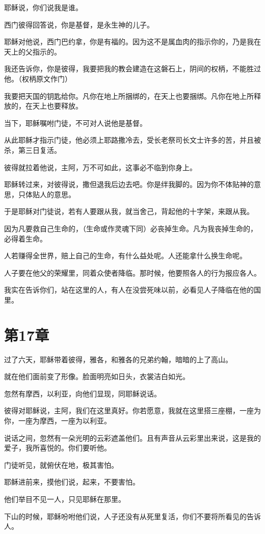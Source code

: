 \documentclass[12pt,oneside]{book}
\begin{document}
耶稣说，你们说我是谁。

西门彼得回答说，你是基督，是永生神的儿子。

耶稣对他说，西门巴约拿，你是有福的。因为这不是属血肉的指示你的，乃是我在天上的父指示的。

我还告诉你，你是彼得，我要把我的教会建造在这磐石上，阴间的权柄，不能胜过他。（权柄原文作门）

我要把天国的钥匙给你。凡你在地上所捆绑的，在天上也要捆绑。凡你在地上所释放的，在天上也要释放。

当下，耶稣嘱咐门徒，不可对人说他是基督。

从此耶稣才指示门徒，他必须上耶路撒冷去，受长老祭司长文士许多的苦，并且被杀，第三日复活。

彼得就拉着他说，主阿，万不可如此，这事必不临到你身上。

耶稣转过来，对彼得说，撒但退我后边去吧。你是绊我脚的。因为你不体贴神的意思，只体贴人的意思。

于是耶稣对门徒说，若有人要跟从我，就当舍己，背起他的十字架，来跟从我。

因为凡要救自己生命的，（生命或作灵魂下同）必丧掉生命。凡为我丧掉生命的，必得着生命。

人若赚得全世界，赔上自己的生命，有什么益处呢。人还能拿什么换生命呢。

人子要在他父的荣耀里，同着众使者降临。那时候，他要照各人的行为报应各人。

我实在告诉你们，站在这里的人，有人在没尝死味以前，必看见人子降临在他的国里。

\chapter{第17章}
过了六天，耶稣带着彼得，雅各，和雅各的兄弟约翰，暗暗的上了高山。

就在他们面前变了形像。脸面明亮如日头，衣裳洁白如光。

忽然有摩西，以利亚，向他们显现，同耶稣说话。

彼得对耶稣说，主阿，我们在这里真好。你若愿意，我就在这里搭三座棚，一座为你，一座为摩西，一座为以利亚。

说话之间，忽然有一朵光明的云彩遮盖他们。且有声音从云彩里出来说，这是我的爱子，我所喜悦的。你们要听他。

门徒听见，就俯伏在地，极其害怕。

耶稣进前来，摸他们说，起来，不要害怕。

他们举目不见一人，只见耶稣在那里。

下山的时候，耶稣吩咐他们说，人子还没有从死里复活，你们不要将所看见的告诉人。
\end{document}
